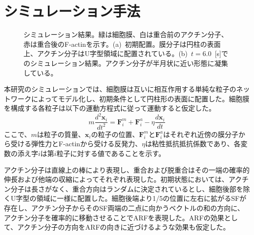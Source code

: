 \documentclass[10pt,twocolumn,a4j]{jarticle}
\begin{document}
\section{シミュレーション手法}
\begin{figure}[tbp]
\centering
 \caption{シミュレーション結果。緑は細胞膜、白は重合前のアクチン分子、赤は重合後のF-actinを示す。(a)~初期配置。膜分子は円柱の表面上、アクチン分子はU字型領域に配置されている。(b)~$t=6.0$~[s]でのシミュレーション結果。アクチン分子が半月状に近い形態に凝集している。}
 \label{fig:res0}
\end{figure}
本研究のシミュレーションでは、細胞膜は互いに相互作用する単純な粒子のネットワークによってモデル化し、初期条件として円柱形の表面に配置した。細胞膜を構成する各粒子は以下の運動方程式に従って運動すると仮定した。
\begin{equation}
m\frac{d^2\bm{x}_i}{dt^2} = \bm{F}^m_i +  \bm{F}^a_i - \eta \frac{d\bm{x}_i}{dt}
\end{equation}
ここで、$m$は粒子の質量、$\bm{x}_i$の粒子の位置、$\bm{F}^m_i$と$\bm{F}^a_i$はそれぞれ近傍の膜分子から受ける弾性力とF-actinから受ける反発力、$\eta$は粘性抵抗抵抗係数であり、各変数の添え字$i$は第$i$粒子に対する値であることを示す。

アクチン分子は直線上の棒により表現し、重合および脱重合はその一端の確率的伸長゙および他端の収縮によってそれぞれ表現した。初期状態においては、アクチン分子は長さがなく、重合方向はランダムに決定されているとし、細胞後部を除くU字型の領域に一様に配置した。細胞後端より1/5の位置に左右に拡がるSFが存在し、アクチン分子からそのSF両端の二点に向かうベクトルの和の方向に、アクチン分子を確率的に移動させることでARFを表現した。ARFの効果として、アクチン分子の方向をARFの向きに近づけるような効果も仮定した。
\end{document}
